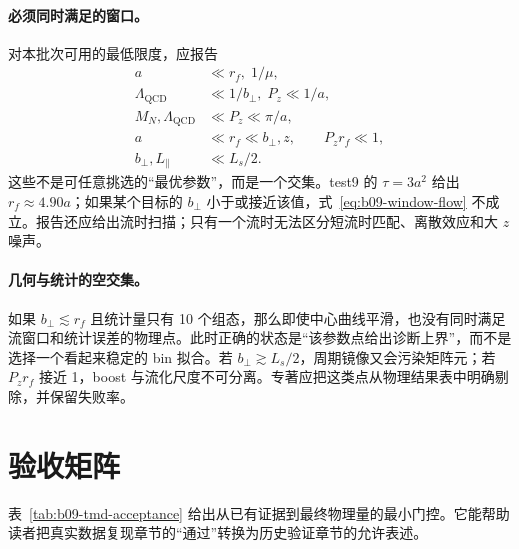 \paragraph{必须同时满足的窗口。}
对本批次可用的最低限度，应报告
\begin{align}
  a&\ll r_f,\;1/\mu, \label{eq:b09-window-a}\\
  \Lambda_{\mathrm{QCD}}&\ll 1/b_\perp,\;P_z\ll 1/a, \label{eq:b09-window-ope}\\
  M_N,\Lambda_{\mathrm{QCD}}&\ll P_z\ll \pi/a, \label{eq:b09-window-lamet}\\
  a&\ll r_f\ll b_\perp,z,\qquad P_zr_f\ll1, \label{eq:b09-window-flow}\\
  b_\perp,L_\parallel&\ll L_s/2. \label{eq:b09-window-volume}
\end{align}
这些不是可任意挑选的“最优参数”，而是一个交集。test9 的 \(\tau=3a^2\) 给出 \(r_f\approx4.90a\)；如果某个目标的 \(b_\perp\) 小于或接近该值，式~\eqref{eq:b09-window-flow} 不成立。报告还应给出流时扫描；只有一个流时无法区分短流时匹配、离散效应和大 \(z\) 噪声。

\paragraph{几何与统计的空交集。}
如果 \(b_\perp\lesssim r_f\) 且统计量只有 10 个组态，那么即使中心曲线平滑，也没有同时满足流窗口和统计误差的物理点。此时正确的状态是“该参数点给出诊断上界”，而不是选择一个看起来稳定的 bin 拟合。若 \(b_\perp\gtrsim L_s/2\)，周期镜像又会污染矩阵元；若 \(P_zr_f\) 接近 1，boost 与流化尺度不可分离。专著应把这类点从物理结果表中明确剔除，并保留失败率。

\section{验收矩阵}

表~\ref{tab:b09-tmd-acceptance} 给出从已有证据到最终物理量的最小门控。它能帮助读者把真实数据复现章节的“通过”转换为历史验证章节的允许表述。

